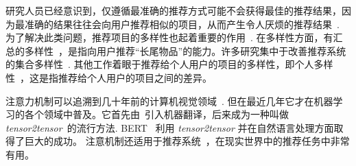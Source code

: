 
研究人员已经意识到，仅遵循最准确的推荐方式可能不会获得最佳的推荐结果，因为最准确的结果往往会向用户推荐相似的项目，从而产生令人厌烦的推荐结果~\cite{panniello2014comparing}. 为了解决此类问题，推荐项目的多样性也起着重要的作用~\cite{slaney2006measuring}. 在多样性方面，有汇总的多样性~\cite{adomavicius2011improving}，是指向用户推荐“长尾物品”的能力。许多研究集中于改善推荐系统的集合多样性~\cite{bag2019integrated,adomavicius2011improving,niemann2013new,qin2013promoting}. 其他工作着眼于推荐给个人用户的项目的多样性，即个人多样性~\cite{adomavicius2011improving,yu2019recommendation,kalaivanan2013recommendation,di2014analysis}，这是指推荐给个人用户的项目之间的差异。


注意力机制可以追溯到几十年前的计算机视觉领域~\cite{burt1988attention,sun2003object}. 但在最近几年它才在机器学习的各个领域中普及。它首先由~\cite{bahdanau2014neural}引入机器翻译，后来成为一种叫做 \textit{tensor2tensor}~\cite{vaswani2017attention}的流行方法. BERT~\cite{devlin2018bert} 利用 \textit{tensor2tensor} 并在自然语言处理方面取得了巨大的成功。
注意机制还适用于推荐系统~\cite{zhou2018atrank,cen2019representation}，在现实世界中的推荐任务中非常有用。


